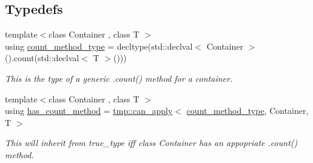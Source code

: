 \subsection*{Typedefs}
\begin{DoxyCompactItemize}
\item 
{\footnotesize template$<$class Container , class T $>$ }\\using \hyperlink{namespaceas_a9bd788709567003423247a9db4ba1074}{count\+\_\+method\+\_\+type} = decltype(std\+::declval$<$ Container $>$().count(std\+::declval$<$ T $>$()))
\begin{DoxyCompactList}\small\item\em This is the type of a generic .count() method for a container. \end{DoxyCompactList}\item 
{\footnotesize template$<$class Container , class T $>$ }\\using \hyperlink{namespaceas_a9e0fcaa3ddb46647d8979282465685da}{has\+\_\+count\+\_\+method} = \hyperlink{namespaceas_1_1tmp_a44a275bd3c66d727fb1b6f0179d49e19}{tmp\+::can\+\_\+apply}$<$ \hyperlink{namespaceas_a9bd788709567003423247a9db4ba1074}{count\+\_\+method\+\_\+type}, Container, T $>$
\begin{DoxyCompactList}\small\item\em This will inherit from true\+\_\+type iff class Container has an appopriate .count() method. \end{DoxyCompactList}\end{DoxyCompactItemize}

